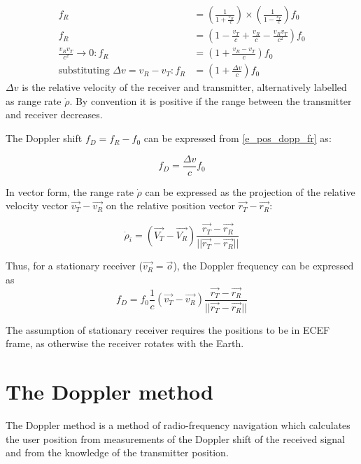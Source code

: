 \begin{align}
    f_R &= \left( \frac{1}{1 + \frac{v_R}{c}} \right) \times \left( \frac{1}{1 - \frac{v_T}{c}} \right) f_0 \nonumber \\
    f_R &= \left( 1 - \frac{v_T}{c} + \frac{v_R}{c} - \frac{v_R v_T}{c^2} \right) f_0 \nonumber \\
    \frac{v_R v_T}{c^2} \rightarrow 0: f_R &= \left( 1 + \frac{v_R - v_T}{c} \right) f_0 \nonumber \\
    \text{substituting } \Delta v = v_R - v_T: f_R &= \left( 1 + \frac{\Delta v}{c} \right) f_0 \label{e_pos_dopp_fr}
\end{align}
$\Delta v$ is the relative velocity of the receiver and transmitter, alternatively labelled as range rate $\dot\rho$. By convention it is positive if the range between the transmitter and receiver decreases.

The Doppler shift $f_D = f_R - f_0$ can be expressed from \autoref{e_pos_dopp_fr} as:

\begin{equation}
\label{e_pos_dopp_fd}
f_D = \frac{\Delta v}{c} f_0 
\end{equation}

In vector form, the range rate $\dot\rho$ can be expressed as the projection of the relative velocity vector $\Vec{v_T} - \Vec{v_R}$ on the relative position vector $\Vec{r_T} - \Vec{r_R}$:

\begin{equation}
    \label{e_pos_range_rate}
    \dot\rho_i = (\Vec{V_T} - \Vec{V_R}) \frac{\Vec{r_T} - \Vec{r_R}}{||\Vec{r_T} - \Vec{r_R}||}
\end{equation}

Thus, for a stationary receiver ($\Vec{v_R} = \Vec{o}$), the Doppler frequency can be expressed as
\begin{equation}
    \label{e_pos_dopp_shift}
    f_D = f_0 \frac{1}{c} (\Vec{v_T} - \Vec{v_R}) \frac{\Vec{r_T} - \Vec{r_R}}{||\Vec{r_T} - \Vec{r_R}||}
\end{equation}

The assumption of stationary receiver requires the positions to be in ECEF frame, as otherwise the receiver rotates with the Earth.



\section{The Doppler method}
\label{s_pos_doppler_method}
The Doppler method is a method of radio-frequency navigation which calculates the user position from measurements of the Doppler shift of the received signal and from the knowledge of the transmitter position.

